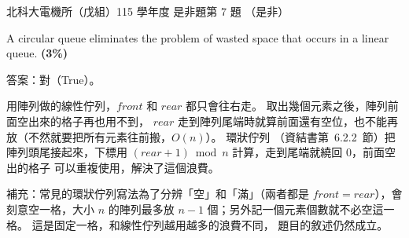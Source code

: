 \begin{pastexam}[label={px:ntut-115-ee-ds-07}]{北科大電機所（戊組）115 學年度 是非題第 7 題}
（是非）

A circular queue eliminates the problem of wasted space that occurs in a linear queue.
\textbf{(3\%)}
\end{pastexam}

\begin{pastsoln}
答案：對（True）。

用陣列做的線性佇列，$\mathit{front}$ 和 $\mathit{rear}$ 都只會往右走。 取出幾個元素之後，陣列前面空出來的格子再也用不到，
$\mathit{rear}$ 走到陣列尾端時就算前面還有空位，也不能再放（不然就要把所有元素往前搬，$O(n)$）。 環狀佇列
（資結書第~6.2.2~節）把陣列頭尾接起來，下標用 $(\mathit{rear} + 1) \bmod n$ 計算，走到尾端就繞回 $0$，前面空出的格子
可以重複使用，解決了這個浪費。

補充：常見的環狀佇列寫法為了分辨「空」和「滿」（兩者都是 $\mathit{front} = \mathit{rear}$），會刻意空一格，大小 $n$
的陣列最多放 $n - 1$ 個；另外記一個元素個數就不必空這一格。 這是固定一格，和線性佇列越用越多的浪費不同，
題目的敘述仍然成立。
\end{pastsoln}

